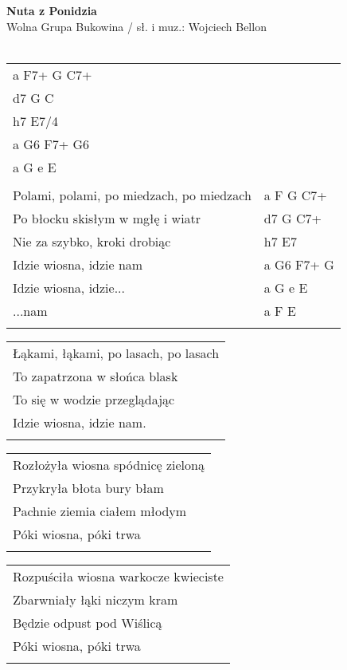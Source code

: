 \documentclass[a5paper]{article}
\begin{document}


\noindent
\fontsize{12pt}{15pt}\selectfont
\textbf{Nuta z Ponidzia} \\
\fontsize{8pt}{10pt}\selectfont
Wolna Grupa Bukowina / sł. i muz.: Wojciech Bellon \\ \\
\fontsize{10pt}{12pt}\selectfont
{}
\begin{tabular}{@{}p{7.50cm}p{3cm}@{}}
\noindent
a F7+ G C7+ \\
d7 G C \\
h7 E7/4 \\
a G6 F7+ G6 \\
a G e E \\ \\
Polami, polami, po miedzach, po miedzach & a F G C7+ \\
Po błocku skisłym w mgłę i wiatr & d7 G C7+ \\
Nie za szybko, kroki drobiąc & h7 E7 \\
Idzie wiosna, idzie nam & a G6 F7+ G \\
Idzie wiosna, idzie... & a G e E \\
...nam & a F E \\ \\
\end{tabular}

\noindent
\begin{tabular}{@{}p{7.50cm}@{}}
Łąkami, łąkami, po lasach, po lasach \\
To zapatrzona w słońca blask \\
To się w wodzie przeglądając \\
Idzie wiosna, idzie nam. \\ \\
\end{tabular}

\noindent
\begin{tabular}{@{}p{7.50cm}@{}}
Rozłożyła wiosna spódnicę zieloną \\
Przykryła błota bury błam \\
Pachnie ziemia ciałem młodym \\
Póki wiosna, póki trwa \\ \\
\end{tabular}

\noindent
\begin{tabular}{@{}p{7.50cm}@{}}
Rozpuściła wiosna warkocze kwieciste \\
Zbarwniały łąki niczym kram \\
Będzie odpust pod Wiślicą \\
Póki wiosna, póki trwa \\ \\
\end{tabular}
\end{document}
